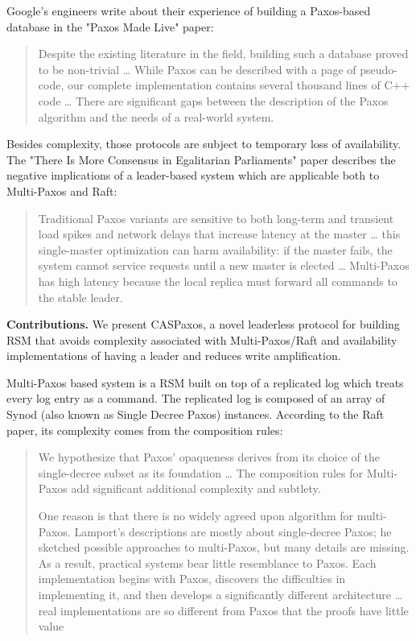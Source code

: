 \documentclass[a4paper,USenglish]{lipics-v2018}
\theoremstyle{definition}
\begin{document}
Google's engineers write about their experience of building a Paxos-based database in the "Paxos Made Live"\cite{chubby} paper:

\begin{quote}
    Despite the existing literature in the field, building such a database proved to be non-trivial \ldots{} While Paxos can be described with a page of pseudo-code, our complete implementation contains several thousand lines of C++ code \ldots{} There are significant gaps between the description of the Paxos algorithm and the needs of a real-world system.
\end{quote}

Besides complexity, those protocols are subject to temporary loss of availability. The "There Is More Consensus in Egalitarian Parliaments" paper\cite{epaxos} describes the negative implications of a leader-based system which are applicable both to Multi-Paxos and Raft:

\begin{quote}
    Traditional Paxos variants are sensitive to both long-term and transient load spikes and network delays that increase latency at the master \ldots{} this single-master optimization can harm availability: if the master fails, the system cannot service requests until a new master is elected \ldots{} Multi-Paxos has high latency because the local replica must forward all commands to the stable leader.
\end{quote}

{\bf Contributions.} We present CASPaxos, a novel leaderless protocol for building RSM that avoids complexity associated with Multi-Paxos/Raft and availability implementations of having a leader and reduces write amplification.

Multi-Paxos based system is a RSM built on top of a replicated log which treats every log entry as a command. The replicated log is composed of an array of Synod\cite{lamport01} (also known as Single Decree Paxos) instances. According to the Raft paper, its complexity comes from the composition rules:

\begin{quote}
    We hypothesize that Paxos’ opaqueness derives from its choice of the single-decree subset as its foundation \ldots{} The composition rules for Multi-Paxos add significant additional complexity and subtlety.

    One reason is that there is no widely agreed upon algorithm for multi-Paxos. Lamport’s descriptions are mostly about single-decree Paxos; he sketched possible approaches to multi-Paxos, but many details are missing. As a result, practical systems bear little resemblance to Paxos. Each implementation begins with Paxos, discovers the difficulties in implementing it, and then develops a significantly different architecture \ldots{} real implementations are so different from Paxos that the proofs have little value
\end{quote}
\end{document}
